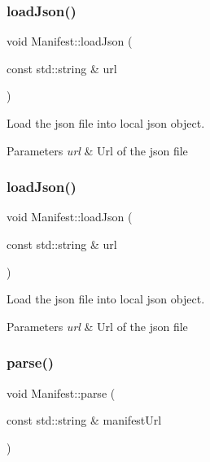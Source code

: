 \subsubsection{\texorpdfstring{load\+Json()}{loadJson()}\hspace{0.1cm}{\footnotesize\ttfamily [1/2]}}
{\footnotesize\ttfamily void Manifest\+::load\+Json (\begin{DoxyParamCaption}\item[{const std\+::string \&}]{url }\end{DoxyParamCaption})\hspace{0.3cm}{\ttfamily [protected]}}



Load the json file into local json object. 


\begin{DoxyParams}{Parameters}
{\em url} & Url of the json file \\
\hline
\end{DoxyParams}
\mbox{\label{classManifest_a47aa1ad3edc161e420109489ce36823f}} 
\subsubsection{\texorpdfstring{load\+Json()}{loadJson()}\hspace{0.1cm}{\footnotesize\ttfamily [2/2]}}
{\footnotesize\ttfamily void Manifest\+::load\+Json (\begin{DoxyParamCaption}\item[{const std\+::string \&}]{url }\end{DoxyParamCaption})\hspace{0.3cm}{\ttfamily [protected]}}



Load the json file into local json object. 


\begin{DoxyParams}{Parameters}
{\em url} & Url of the json file \\
\hline
\end{DoxyParams}
\mbox{\label{classManifest_abbaa9d1b3e86c2ff26d60a4d94209cd7}} 
\subsubsection{\texorpdfstring{parse()}{parse()}\hspace{0.1cm}{\footnotesize\ttfamily [1/2]}}
{\footnotesize\ttfamily void Manifest\+::parse (\begin{DoxyParamCaption}\item[{const std\+::string \&}]{manifest\+Url }\end{DoxyParamCaption})\hspace{0.3cm}{\ttfamily [protected]}}



